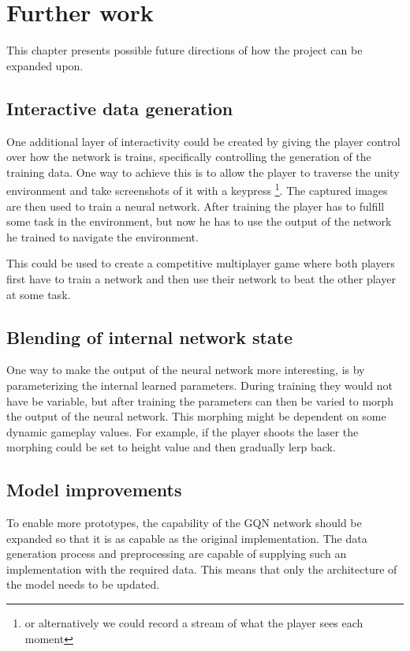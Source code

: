 
\chapter{Further work}
This chapter presents possible future directions of how the project can be expanded upon.


\section{Interactive data generation}
One additional layer of interactivity could be created by giving the player control over how the network is trains, specifically controlling the generation of the training data. One way to achieve this is to allow the player to traverse the unity environment and take screenshots of it with a keypress \footnote{or alternatively we could record a stream of what the player sees each moment}. The captured images are then used to train a neural network. After training the player has to fulfill some task in the environment, but now he has to use the output of the network he trained to navigate the environment.

This could be used to create a competitive multiplayer game where both players first have to train a network and then use their network to beat the other player at some task.


\section{Blending of internal network state}
One way to make the output of the neural network more interesting, is by parameterizing the internal learned parameters. During training they would not have be variable, but after training the parameters can then be varied to morph the output of the neural network. This morphing might be dependent on some dynamic gameplay values. For example, if the player shoots the laser the morphing could be set to height value and then gradually lerp back.


\section{Model improvements}
To enable more prototypes, the capability of the GQN network should be expanded so that it is as capable as the original implementation. The data generation process and preprocessing are capable of supplying such an implementation with the required data. This means that only the architecture of the model needs to be updated.

